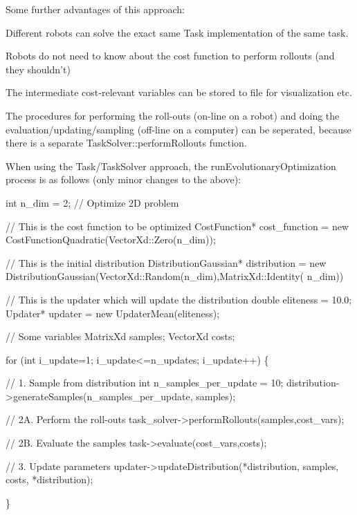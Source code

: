 Some further advantages of this approach\+: \begin{DoxyItemize}
\item Different robots can solve the exact same Task implementation of the same task. \item Robots do not need to know about the cost function to perform rollouts (and they shouldn't) \item The intermediate cost-\/relevant variables can be stored to file for visualization etc. \item The procedures for performing the roll-\/outs (on-\/line on a robot) and doing the evaluation/updating/sampling (off-\/line on a computer) can be seperated, because there is a separate Task\+Solver\+::perform\+Rollouts function.\end{DoxyItemize}
When using the Task/\+Task\+Solver approach, the run\+Evolutionary\+Optimization process is as follows (only minor changes to the above)\+: 
\begin{DoxyCode}
\textcolor{keywordtype}{int} n\_dim = 2; \textcolor{comment}{// Optimize 2D problem}

\textcolor{comment}{// This is the cost function to be optimized}
CostFunction* cost\_function = \textcolor{keyword}{new} CostFunctionQuadratic(VectorXd::Zero(n\_dim));

\textcolor{comment}{// This is the initial distribution}
DistributionGaussian* distribution = \textcolor{keyword}{new} DistributionGaussian(VectorXd::Random(n\_dim),MatrixXd::Identity(
      n\_dim)) 

\textcolor{comment}{// This is the updater which will update the distribution}
double eliteness = 10.0;
Updater* updater = new UpdaterMean(eliteness);

\textcolor{comment}{// Some variables}
MatrixXd samples;
VectorXd costs;

for (\textcolor{keywordtype}{int} i\_update=1; i\_update<=n\_updates; i\_update++)
\{
  
    \textcolor{comment}{// 1. Sample from distribution}
    \textcolor{keywordtype}{int} n\_samples\_per\_update = 10;
    distribution->generateSamples(n\_samples\_per\_update, samples);
  
    \textcolor{comment}{// 2A. Perform the roll-outs}
    task\_solver->performRollouts(samples,cost\_vars);
  
    \textcolor{comment}{// 2B. Evaluate the samples}
    task->evaluate(cost\_vars,costs);
  
    \textcolor{comment}{// 3. Update parameters}
    updater->updateDistribution(*distribution, samples, costs, *distribution);
    
\}
\end{DoxyCode}
 